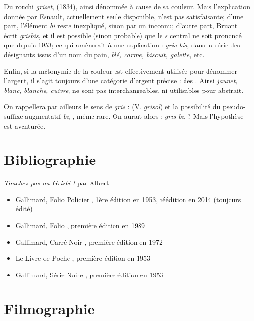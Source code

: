 Du rouchi \emph{griset},  (1834), ainsi dénommée à cause de sa couleur. Mais l'explication donnée par Esnault, actuellement seule 
disponible, n'est pas satisfaisante; d'une part, l'élément \emph{bi} reste
inexpliqué, sinon par un  inconnu; d'autre part, Bruant écrit
\emph{grisbis}, et il est possible (sinon probable) que le \emph{s} central ne
soit prononcé que depuis 1953; ce qui amènerait à une explication :
\emph{gris-bis}, dans la série des désignants issus d'un nom du pain,
\emph{blé, carme, biscuit, galette}, etc.

Enfin, si la métonymie de la couleur est effectivement utilisée pour dénommer
l'argent, il s'agit toujours d'une catégorie d'argent précise : des .
Ainsi \emph{jaunet, blanc, blanche, cuivre}, ne sont pas interchangeables, ni 
utilisables pour  abstrait.

On rappellera par ailleurs le sens de \emph{gris} :  (V. \emph{grisol}) et la possibilité du pseudo-suffixe augmentatif \emph{bi}, , même rare. On aurait alors : \emph{gris-bi},  ? Mais l'hypothèse est aventurée.


\section{Bibliographie\label{preamble-biblio}}


\emph{Touchez pas au Grisbi !} par Albert 

\begin{itemize}
	\item Gallimard, Folio Policier , 1ère édition en 1953, réédition en 2014 (toujours édité)
	\item Gallimard, Folio , première édition en 1989
	\item Gallimard, Carré Noir , première édition en 1972
	\item Le Livre de Poche , première édition en 1953
	\item Gallimard, Série Noire , première édition en 1953
\end{itemize}


\section{Filmographie\label{preamble-filmography}}



